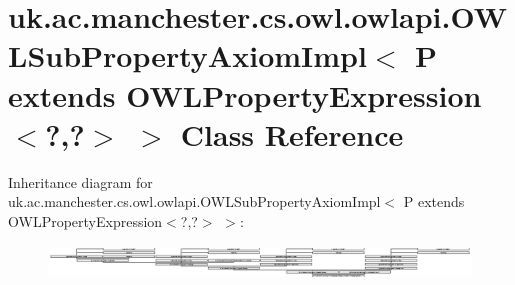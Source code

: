 \hypertarget{classuk_1_1ac_1_1manchester_1_1cs_1_1owl_1_1owlapi_1_1_o_w_l_sub_property_axiom_impl_3_01_p_01ex22572232b03223b699ed74a4771c1e6d}{\section{uk.\-ac.\-manchester.\-cs.\-owl.\-owlapi.\-O\-W\-L\-Sub\-Property\-Axiom\-Impl$<$ P extends O\-W\-L\-Property\-Expression$<$?,?$>$ $>$ Class Reference}
\label{classuk_1_1ac_1_1manchester_1_1cs_1_1owl_1_1owlapi_1_1_o_w_l_sub_property_axiom_impl_3_01_p_01ex22572232b03223b699ed74a4771c1e6d}
}
Inheritance diagram for uk.\-ac.\-manchester.\-cs.\-owl.\-owlapi.\-O\-W\-L\-Sub\-Property\-Axiom\-Impl$<$ P extends O\-W\-L\-Property\-Expression$<$?,?$>$ $>$\-:\begin{figure}[H]
\begin{center}
\leavevmode
\includegraphics[height=0.910569cm]{classuk_1_1ac_1_1manchester_1_1cs_1_1owl_1_1owlapi_1_1_o_w_l_sub_property_axiom_impl_3_01_p_01ex22572232b03223b699ed74a4771c1e6d}
\end{center}
\end{figure}
